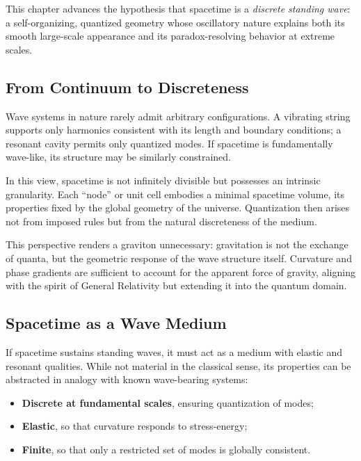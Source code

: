 \documentclass[12pt]{article}
\begin{document}
This chapter advances the hypothesis that spacetime is a \emph{discrete standing wave}: a self-organizing, quantized geometry whose oscillatory nature explains both its smooth large-scale appearance and its paradox-resolving behavior at extreme scales.

\subsection{From Continuum to Discreteness}

Wave systems in nature rarely admit arbitrary configurations. A vibrating string supports only harmonics consistent with its length and boundary conditions; a resonant cavity permits only quantized modes. If spacetime is fundamentally wave-like, its structure may be similarly constrained. 

In this view, spacetime is not infinitely divisible but possesses an intrinsic granularity. Each “node” or unit cell embodies a minimal spacetime volume, its properties fixed by the global geometry of the universe. Quantization then arises not from imposed rules but from the natural discreteness of the medium. 

This perspective renders a graviton unnecessary: gravitation is not the exchange of quanta, but the geometric response of the wave structure itself. Curvature and phase gradients are sufficient to account for the apparent force of gravity, aligning with the spirit of General Relativity but extending it into the quantum domain.

\subsection{Spacetime as a Wave Medium}

If spacetime sustains standing waves, it must act as a medium with elastic and resonant qualities. While not material in the classical sense, its properties can be abstracted in analogy with known wave-bearing systems:

\begin{itemize}
  \item \textbf{Discrete at fundamental scales}, ensuring quantization of modes;
  \item \textbf{Elastic}, so that curvature responds to stress-energy;
  \item \textbf{Finite}, so that only a restricted set of modes is globally consistent.
\end{itemize}
\end{document}
